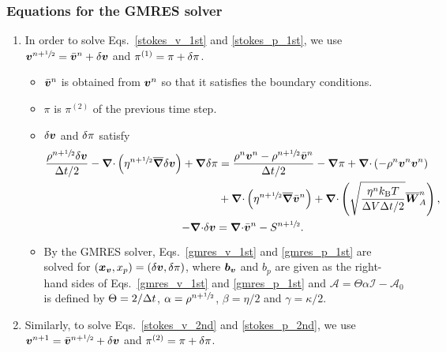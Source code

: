 \documentclass[
10pt
showpacs, showkeys,
amsmath,amssymb,
aps,
pre,
floatfix,
]{revtex4-1}
\newcommand{\divg}{{\V\nabla\cdot}}                       %
\newcommand{\paren}[1]{{(#1)}}                            %
\begin{document}
\subsubsection{Equations for the GMRES solver}

\begin{enumerate}

\item In order to solve Eqs.~\eqref{stokes_v_1st} and \eqref{stokes_p_1st}, we use $\boldsymbol{v}^{n+\sfrac{1}{2}}=\bar{\boldsymbol{v}}^n+\delta\boldsymbol{v}$ and $\pi^\paren{1}=\pi+\d{\pi}$.

\begin{itemize}
\item $\bar{\boldsymbol{v}}^n$ is obtained from $\boldsymbol{v}^n$ so that it satisfies the boundary conditions.
\item $\pi$ is $\pi^\paren{2}$ of the previous time step.
\item $\delta\boldsymbol{v}$ and $\delta\pi$ satisfy
\begin{gather}
\label{gmres_v_1st}
\begin{split}
\frac{\rho^{n+\myhalf}\d{\V{v}}}{\D{t}/2} - \divg\left(\eta^{n+\myhalf}\overline{\grad}\d{\V{v}}\right) + \grad\d{\pi}
& = \frac{\rho^n\V{v}^n-\rho^{n+\myhalf}\bar{\V{v}}^n}{\D{t}/2} - \grad\pi 
+ \divg\left(-\rho^n\V{v}^n\V{v}^n\right) \\
& + \divg\left( \eta^{n+\myhalf} \overline{\grad}\bar{\V{v}}^n \right)
+ \divg\left( \sqrt{\frac{\eta^n k_\mathrm{B}T}{\D{V}\D{t}/2} } \overline{\V{W}}^n_A \right),
\end{split} \\
\label{gmres_p_1st}
-\divg\d{\V{v}} = \divg\bar{\V{v}}^n-S^{n+\myhalf}.
\end{gather}
\item By the GMRES solver, Eqs.~\eqref{gmres_v_1st} and \eqref{gmres_p_1st} are solved for $(\boldsymbol{x}_{\boldsymbol{v}},x_p)=(\delta\boldsymbol{v},\delta\pi)$, where $\boldsymbol{b}_{\boldsymbol{v}}$ and $b_p$ are given as the right-hand sides of Eqs.~\eqref{gmres_v_1st} and \eqref{gmres_p_1st} and 
$\mathcal{A}=\Theta\alpha\mathcal{I}-\mathcal{A}_0$ is defined by $\Theta=2/\Delta t$, $\alpha=\rho^{n+\sfrac{1}{2}}$, $\beta=\eta/2$ and $\gamma=\kappa/2$.
\end{itemize}

\item Similarly, to solve Eqs.~\eqref{stokes_v_2nd} and \eqref{stokes_p_2nd}, we use $\boldsymbol{v}^{n+1}=\bar{\boldsymbol{v}}^{n+\sfrac{1}{2}}+\delta\boldsymbol{v}$ and $\pi^\paren{2}=\pi+\d{\pi}$.


\end{enumerate}
\end{document}
